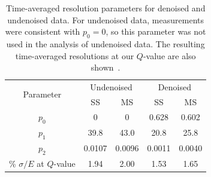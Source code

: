 \begin{table}
\begin{center}
\begin{tabular}{|c|c|c|c|c|}
\hline \multirow{2}{*}{Parameter} & \multicolumn{2}{|c|}{Undenoised} & \multicolumn{2}{|c|}{Denoised}\\
\cline{2-5}& SS & MS & SS & MS \\
\hline $p_0$ & 0 & 0 & 0.628 & 0.602 \\
\hline $p_1$ & 39.8 & 43.0 & 20.8 & 25.8 \\
\hline $p_2$ & 0.0107 & 0.0096 & 0.0011 & 0.0040 \\
\hline \% $\sigma/E$ at $Q$-value & 1.94 & 2.00 & 1.53 & 1.65 \\ \hline
\end{tabular}
\end{center}
\caption{Time-averaged resolution parameters for denoised and undenoised data.  For undenoised data, measurements were consistent with $p_0 = 0$, so this parameter was not used in the analysis of undenoised data.  The resulting time-averaged resolutions at our $Q$-value are also shown~\cite{AverageEnergyResolutionDocument}.}
\label{tab:ResolutionFunctions_DenoisedUndenoisedComparison}
\end{table}

